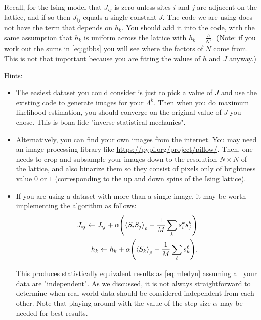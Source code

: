 \documentclass[11pt]{article}
\begin{document}
Recall, for the Ising model that \(J_{ij}\) is zero unless
sites \(i\) and \(j\) are adjacent on the lattice, and if so then \(J_{ij}\)
equals a single constant \(J\). The code we are using does not have the term
that depends on \(h_{k}\). You should add it into the code, with the same
assumption that \(h_{k}\) is uniform across the lattice with
\(h_{k} = \frac{h}{N^{2}}\). (Note: if you work out the sums in
\eqref{eq:gibbs} you will see where the factors of \(N\) come from. This is not
that important because you are fitting the values of \(h\) and \(J\) anyway.)

Hints:
\begin{itemize}
\item The easiest dataset you could consider is just to pick a value of \(J\) and use the existing code to generate images for your \(\Lambda^{k}\). Then when you do maximum likelihood estimation, you should converge on the original value of \(J\) you chose. This is bona fide "inverse statistical mechanics".
\item Alternatively, you can find your own images from the internet. You may need an image processing library like \url{https://pypi.org/project/pillow/}. Then, one needs to crop and subsample your images down to the resolution \(N \times N\) of the lattice, and also binarize them so they consist of pixels only of brightness value \(0\) or \(1\) (corresponding to the up and down spins of the Ising lattice).
\item If you are using a dataset with more than a single image, it may be worth implementing the algorithm as follows:
\begin{align*}
J_{ij} \leftarrow J_{ij} + \alpha \qty(\ev{S_{i}S_{j}}_{\rho} - \frac{1}{M} \sum_{k} s^{k}_{i}s^{k}_{j}) \\
h_{k} \leftarrow h_{k} + \alpha \qty(\ev{S_{k}}_{\rho} - \frac{1}{M} \sum_{\ell} s^{\ell}_{k}).
\end{align*}

This produces statistically equivalent results as \eqref{eq:mledyn} assuming all your data are "independent". As we discussed, it is not always straightforward to determine when real-world data should be considered independent from each other. Note that playing around with the value of the step size \(\alpha\) may be needed for best results.
\end{itemize}
\end{document}
